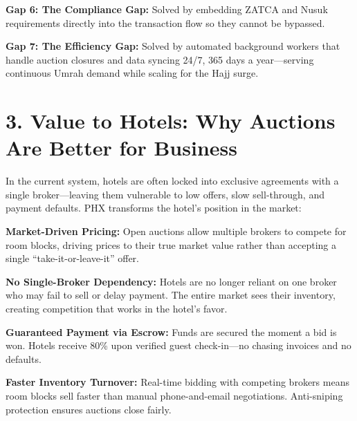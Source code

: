 \documentclass[11pt,a4paper]{article}
\begin{document}
\vspace{0.3cm}

\textbf{Gap 6: The Compliance Gap:} Solved by embedding ZATCA and Nusuk requirements directly into the transaction flow so they cannot be bypassed.

\vspace{0.3cm}

\begin{samepage}
\textbf{Gap 7: The Efficiency Gap:} Solved by automated background workers that handle auction closures and data syncing 24/7, 365 days a year---serving continuous Umrah demand while scaling for the Hajj surge.
\end{samepage}

\section*{3. Value to Hotels: Why Auctions Are Better for Business}


In the current system, hotels are often locked into exclusive agreements with a single broker---leaving them vulnerable to low offers, slow sell-through, and payment defaults. PHX transforms the hotel's position in the market:


\vspace{0.3cm}

\textbf{Market-Driven Pricing:} Open auctions allow multiple brokers to compete for room blocks, driving prices to their true market value rather than accepting a single ``take-it-or-leave-it'' offer.

\vspace{0.3cm}

\textbf{No Single-Broker Dependency:} Hotels are no longer reliant on one broker who may fail to sell or delay payment. The entire market sees their inventory, creating competition that works in the hotel's favor.

\vspace{0.3cm}

\textbf{Guaranteed Payment via Escrow:} Funds are secured the moment a bid is won. Hotels receive 80\% upon verified guest check-in---no chasing invoices and no defaults.

\vspace{0.3cm}

\textbf{Faster Inventory Turnover:} Real-time bidding with competing brokers means room blocks sell faster than manual phone-and-email negotiations. Anti-sniping protection ensures auctions close fairly.
\end{document}
